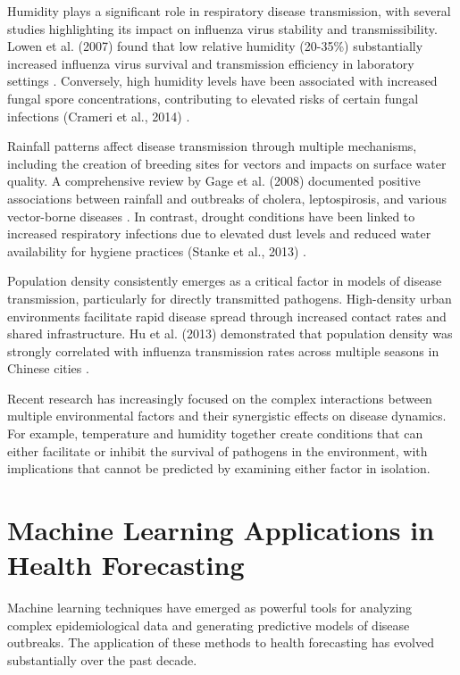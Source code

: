 \documentclass[12pt,a4paper]{report}
\begin{document}
Humidity plays a significant role in respiratory disease transmission, with several studies highlighting its impact on influenza virus stability and transmissibility. Lowen et al. (2007) found that low relative humidity (20-35\%) substantially increased influenza virus survival and transmission efficiency in laboratory settings \cite{lowen2007influenza}. Conversely, high humidity levels have been associated with increased fungal spore concentrations, contributing to elevated risks of certain fungal infections (Crameri et al., 2014) \cite{crameri2014fungi}.

Rainfall patterns affect disease transmission through multiple mechanisms, including the creation of breeding sites for vectors and impacts on surface water quality. A comprehensive review by Gage et al. (2008) documented positive associations between rainfall and outbreaks of cholera, leptospirosis, and various vector-borne diseases \cite{gage2008climate}. In contrast, drought conditions have been linked to increased respiratory infections due to elevated dust levels and reduced water availability for hygiene practices (Stanke et al., 2013) \cite{stanke2013health}.

Population density consistently emerges as a critical factor in models of disease transmission, particularly for directly transmitted pathogens. High-density urban environments facilitate rapid disease spread through increased contact rates and shared infrastructure. Hu et al. (2013) demonstrated that population density was strongly correlated with influenza transmission rates across multiple seasons in Chinese cities \cite{hu2013effect}.

Recent research has increasingly focused on the complex interactions between multiple environmental factors and their synergistic effects on disease dynamics. For example, temperature and humidity together create conditions that can either facilitate or inhibit the survival of pathogens in the environment, with implications that cannot be predicted by examining either factor in isolation.

\section{Machine Learning Applications in Health Forecasting}
Machine learning techniques have emerged as powerful tools for analyzing complex epidemiological data and generating predictive models of disease outbreaks. The application of these methods to health forecasting has evolved substantially over the past decade.
\end{document}
